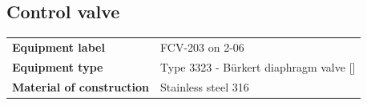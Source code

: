 \newpage
\subsection{Control valve}


\begin{table}[H]
    \centering
    \begin{tabular}{@{}l|l@{}}
    \toprule
      \textbf{Equipment label}  & FCV-203 on 2-06\\
       \textbf{Equipment type}  & Type 3323 - Bürkert diaphragm valve []\\
       \textbf{Material of construction} & Stainless steel 316 \\
       \bottomrule
    \end{tabular}
\end{table}

